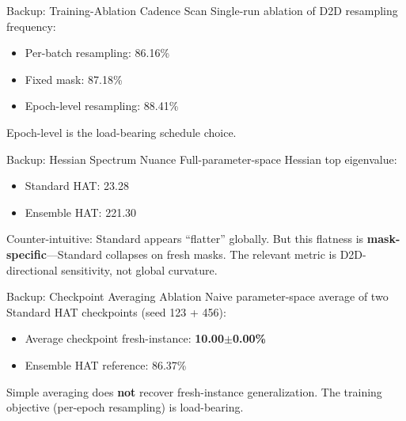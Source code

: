 \documentclass[aspectratio=169,11pt]{beamer}
\begin{document}
\begin{frame}{Backup: Training-Ablation Cadence Scan}
  Single-run ablation of D2D resampling frequency:
  \begin{itemize}
    \item Per-batch resampling: 86.16\%
    \item Fixed mask: 87.18\%
    \item Epoch-level resampling: 88.41\%
  \end{itemize}
  Epoch-level is the load-bearing schedule choice.
\end{frame}

\begin{frame}{Backup: Hessian Spectrum Nuance}
  Full-parameter-space Hessian top eigenvalue:
  \begin{itemize}
    \item Standard HAT: 23.28
    \item Ensemble HAT: 221.30
  \end{itemize}
  Counter-intuitive: Standard appears ``flatter'' globally. But this flatness is \textbf{mask-specific}---Standard collapses on fresh masks. The relevant metric is D2D-directional sensitivity, not global curvature.
\end{frame}

\begin{frame}{Backup: Checkpoint Averaging Ablation}
  Naive parameter-space average of two Standard HAT checkpoints (seed 123 + 456):
  \begin{itemize}
    \item Average checkpoint fresh-instance: \textbf{10.00$\pm$0.00\%}
    \item Ensemble HAT reference: 86.37\%
  \end{itemize}
  Simple averaging does \textbf{not} recover fresh-instance generalization. The training objective (per-epoch resampling) is load-bearing.
\end{frame}
\end{document}
